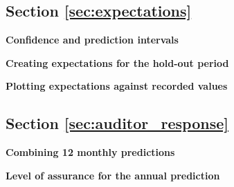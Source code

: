 \subsection{Section \ref{sec:expectations}}

\begin{exercise}
\label{ex:Confidence_and_prediction_intervals}

\textbf{Confidence and prediction intervals}



\end{exercise}

\begin{exercise}
\label{ex:expectations}

\textbf{Creating expectations for the hold-out period}




\end{exercise}

\begin{exercise}
\label{ex:Plotting_expectations_against_recorded_values}

\textbf{Plotting expectations against recorded values}



\end{exercise}

\subsection{Section \ref{sec:auditor_response}}

\begin{exercise}
\label{ex:Combining_12_monthly_predictions}

\textbf{Combining 12 monthly predictions}





\end{exercise}

\begin{exercise}
\label{ex:level_of_assurance_for_the_annual_prediction}

\textbf{Level of assurance for the annual prediction}








\end{exercise}


